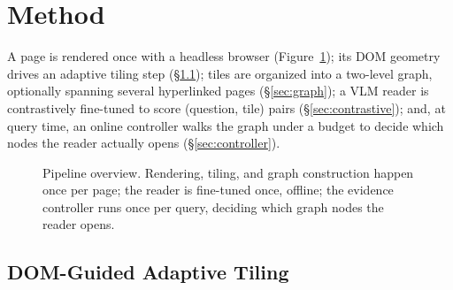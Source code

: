 \section{Method}
\label{sec:method}

A page is rendered once with a headless browser (Figure~\ref{fig:pipeline}); its DOM geometry drives an adaptive tiling step (\S\ref{sec:tiling}); tiles are organized into a two-level graph, optionally spanning several hyperlinked pages (\S\ref{sec:graph}); a VLM reader is contrastively fine-tuned to score (question, tile) pairs (\S\ref{sec:contrastive}); and, at query time, an online controller walks the graph under a budget to decide which nodes the reader actually opens (\S\ref{sec:controller}).

\begin{figure}[t]
\centering
{}
\caption{Pipeline overview. Rendering, tiling, and graph construction happen once per page; the reader is fine-tuned once, offline; the evidence controller runs once per query, deciding which graph nodes the reader opens.}
\label{fig:pipeline}
\end{figure}

\subsection{DOM-Guided Adaptive Tiling}
\label{sec:tiling}

